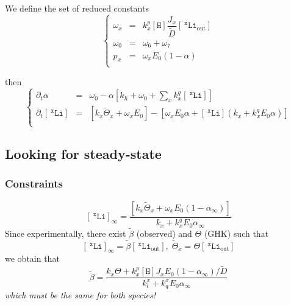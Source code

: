 \documentclass[aps,onecolumn,12pt]{revtex4}
\newcommand{\mychem}[1]{\mathtt{#1}}
\newcommand{\myconc}[1]{\left\lbrack{#1}\right\rbrack}
\newcommand{\spLi}[1]{{~^{\mychem{#1}}\mychem{Li}}}
\newcommand{\Li}[1]{\myconc{\spLi{#1}}}
\newcommand{\spLiOut}[1]{{\spLi{#1}}_{\mathrm{out}}}
\newcommand{\LiOut}[1]{\myconc{\spLiOut{#1}}}
\newcommand{\spproton}{\mychem{H}}
\newcommand{\proton}{\myconc{\spproton}}
\begin{document}
We define the set of reduced constants
\begin{equation}
\left\lbrace
	\begin{array}{rcl}
	\omega_x & = &  k_x^p \proton \dfrac{J_x}{\tilde{D}}\LiOut{x}\\
	\omega_0 & = & \omega_6 + \omega_7\\
	p_x & = & \omega_x E_0 \left(1-\alpha\right)\\
	\end{array}
\right.
\end{equation}


then
\begin{equation}
\boxed{
\left\lbrace
	\begin{array}{rcl}
		\partial_t\alpha    & = & \omega_0 - \alpha\left\lbrack k_h+\omega_0+{\sum_x k_x^q \Li{x}} \right\rbrack\\
		\partial_t\Li{x} & = & \left\lbrack k_x\tilde{\Theta}_x+\omega_x E_0\right\rbrack
		-\left\lbrack
			\omega_x E_0\alpha +  \Li{x}  \left(k_x + k_x^q E_0\alpha\right)
		\right\rbrack\\
	\end{array}
\right.
}
\end{equation}

\subsection{Looking for steady-state}
\subsubsection{Constraints}
\begin{equation}
	\Li{x}_\infty = \dfrac{\left\lbrack k_x\tilde{\Theta}_x+\omega_x E_0 \left(1-\alpha_\infty\right)\right\rbrack}{k_x+ k_x^q E_0\alpha_\infty}
\end{equation}
Since experimentally, there exist $\tilde{\beta}$ (observed) and $\Theta$ (GHK) such that
\begin{equation}
	\Li{x}_\infty=\tilde\beta\LiOut{x},\;\tilde{\Theta}_x = \Theta \LiOut{x}
\end{equation}
we obtain that
\begin{equation}
		\tilde\beta = \dfrac{k_x\Theta + k_x^p \proton {J_x} E_0 (1-\alpha_\infty)/\tilde{D}}{k_l^x+ k_q^x E_0\alpha_\infty}
\end{equation}
\textit{which must be the same for both species!}
\end{document}
